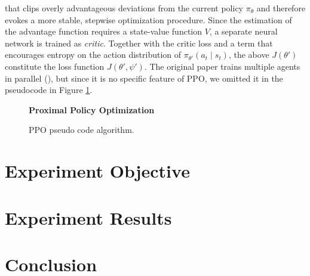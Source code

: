 \documentclass[a4paper, 11pt]{article}
\begin{document}
	that clips overly advantageous deviations from the current policy $\pi_{\theta}$ and therefore evokes a more stable, stepwise optimization procedure. Since the estimation of the advantage function requires a state-value function $V$, a separate neural network is trained as \textit{critic}. Together with the critic loss and a term that encourages entropy on the action distribution of $\pi_{\theta'}(a_t\mid s_t)$, the above $J(\theta')$ constitute the loss function $J(\theta',\psi')$. The original paper trains multiple agents in parallel (\cite{schulman2017proximal}), but since it is no specific feature of PPO, we omitted it in the pseudocode in Figure \ref{fig:ppo}.
	\begin{figure}[H]
		\begin{algorithm}[H]
			\caption{\textbf{Proximal Policy Optimization}}
			\small %
			\raggedright
			\renewcommand{\algorithmicrequire}{\textbf{Initialize:}} %
			\begin{algorithmic}[1]
				\ENDFOR
				\ENDFOR
				\ENDWHILE
			\end{algorithmic}
		\end{algorithm}
		\caption{PPO pseudo code algorithm.}
		\label{fig:ppo}
	\end{figure}
	\section{Experiment Objective}
	\section{Experiment Results}
	\section{Conclusion}
	
\end{document}
